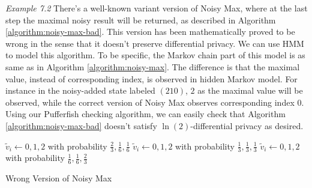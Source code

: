 \textit{Example 7.2} There's a well-known variant version of Noisy Max, where at the last step the maximal
noisy result will be returned, as described in Algorithm \ref{algorithm:noisy-max-bad}.
This version has been mathematically proved to be wrong in the sense that it doesn't preserve differential privacy.
We can use HMM to model this algorithm.
To be specific, the Markov chain part of this model is as same as in Algorithm \ref{algorithm:noisy-max}.
The difference is that the maximal value, instead of corresponding index, is observed in hidden Markov
model. For instance in the noisy-added state labeled $(210)$,
$2$ as the maximal value will be observed, while the correct version of Noisy Max observes corresponding index $0$. 
Using our Pufferfish checking algorithm, we can easily check that
Algorithm \ref{algorithm:noisy-max-bad} doesn't satisfy $\ln(2)$-differential privacy as desired.
\begin{algorithm}
  \begin{algorithmic}[1]
                {$\tilde{v}_i \leftarrow 0, 1, 2$ with probability
                 $\frac{2}{3}, \frac{1}{6}, \frac{1}{6}$}
                {$\tilde{v}_i \leftarrow 0, 1, 2$ with probability
                 $\frac{1}{3}, \frac{1}{3}, \frac{1}{3}$}
                {$\tilde{v}_i \leftarrow 0, 1, 2$ with probability
                 $\frac{1}{6}, \frac{1}{6}, \frac{2}{3}$}
        \EndMatch
      \EndFor
    \EndFunction
  \end{algorithmic}
  \caption{Wrong Version of Noisy Max}
  \label{algorithm:noisy-max-bad}
\end{algorithm}
